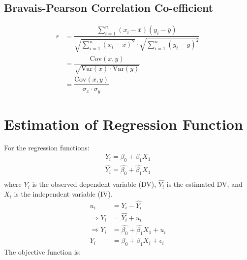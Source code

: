 \documentclass[openany,b5paper]{article}
\begin{document}
\subsection{Bravais-Pearson Correlation Co-efficient}
\begin{align}
r &= \dfrac{\sum_{i=1}^n (x_i-\bar{x})(y_i-\bar{y})}{\sqrt{\sum_{i=1}^n (x_i-\bar{x})^2} \cdot \sqrt{\sum_{i=1}^n (y_i -\bar{y})^2}}\\
& = \dfrac{\text{Cov}(x,y)}{\sqrt{\text{Var}(x) \cdot \text{Var}(y)}}\\
& = \dfrac{\text{Cov}(x,y)}{\sigma_x \cdot \sigma_y}
\end{align}

\section{Estimation of Regression Function}
For the regression functions:
\begin{align}
	Y_i = \beta_0 + \beta_1 X_1\\
	\hat{Y_i} = \hat{\beta_0} + \hat{\beta_1} X_1\\
\end{align}
where $Y_i$ is the observed dependent variable (DV), $\hat{Y_i}$ is the estimated DV, and $X_i$ is the independent variable (IV).
\begin{align}
	u_i &= Y_i - \hat{Y_i}\\
	\Rightarrow Y_i &= \hat{Y_i} + u_i\\
	\Rightarrow Y_i &= \hat{\beta_0} + \hat{\beta_1} X_1 + u_i\\
	Y_i &= \beta_0 + \beta_1 X_i+\epsilon_i
\end{align}
The objective function is:
\end{document}
